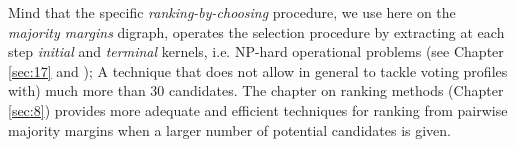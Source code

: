 Mind that the specific \emph{ranking-by-choosing} procedure, we use here on the \emph{majority margins} digraph, operates the selection procedure by extracting at each step \emph{initial} and \emph{terminal} kernels, i.e. NP-hard operational problems (see Chapter \ref{sec:17} and \citet{BIS-1999}); A technique that does not allow in general to tackle voting profiles with) much more than 30 candidates. The chapter on ranking methods (Chapter \ref{sec:8}) provides more adequate and efficient techniques for ranking from pairwise majority margins when a larger number of potential candidates is given.  

\clearpage


%